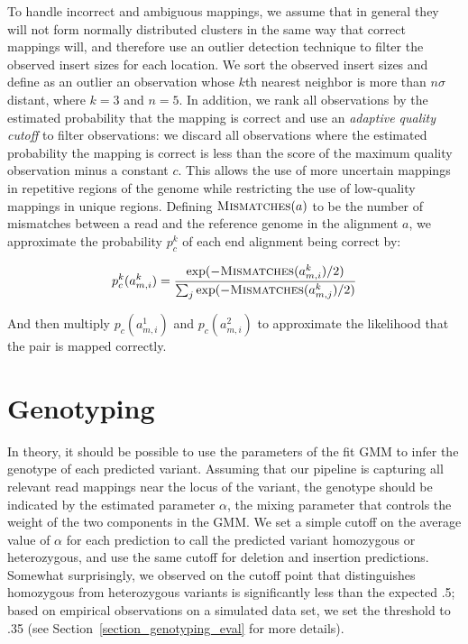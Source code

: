 To handle incorrect and ambiguous mappings, we assume that in general they will not form normally distributed clusters in the same way that correct mappings will, and therefore use an outlier detection technique to filter the observed insert sizes for each location. We sort the observed insert sizes and define as an outlier an observation whose $k$th nearest neighbor is more than $n\sigma$ distant, where $k = 3$ and $n = 5$. In addition, we rank all observations by the estimated probability that the mapping is correct and use an \emph{adaptive quality cutoff} to filter observations: we discard all observations where the estimated probability the mapping is correct is less than the score of the maximum quality observation minus a constant $c$. This allows the use of more uncertain mappings in repetitive regions of the genome while restricting the use of low-quality mappings in unique regions. Defining $\textsc{Mismatches}(a)$ to be the number of mismatches between a read and the reference genome in the alignment $a$, we approximate the probability $p^{k}_c$ of each end alignment being correct by:

\[ p^{k}_c(a^{k}_{m,i}) = \frac{\exp({-\textsc{Mismatches}(a^{k}_{m,i})/2)}}{\sum_j{\exp(-\textsc{Mismatches}(a^{k}_{m,j})/2)}} \]

And then multiply $p_c(a^{1}_{m,i})$ and $p_c(a^{2}_{m,i})$ to approximate the likelihood that the pair is mapped correctly.

\section{Genotyping}\label{section_genotyping}

In theory, it should be possible to use the parameters of the fit GMM to infer the genotype of each predicted variant. Assuming that our pipeline is capturing all relevant read mappings near the locus of the variant, the genotype should be indicated by the estimated parameter $\alpha$, the mixing parameter that controls the weight of the two components in the GMM.  We set a simple cutoff on the average value of $\alpha$ for each prediction to call the predicted variant homozygous or heterozygous, and use the same cutoff for deletion and insertion predictions. Somewhat surprisingly, we observed on the cutoff point that distinguishes homozygous from heterozygous variants is significantly less than the expected .5; based on empirical observations on a simulated data set, we set the threshold to .35 (see Section~\ref{section_genotyping_eval} for more details).


